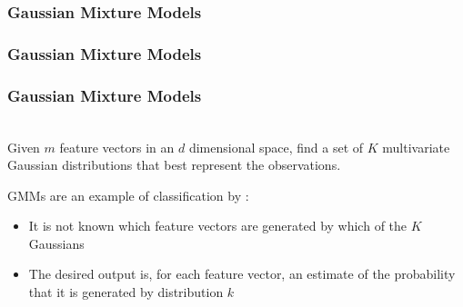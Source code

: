\begin{frame}
  \frametitle{Gaussian Mixture Models \cont}

  \begin{center}
  \end{center}
\end{frame}


\begin{frame}
  \frametitle{Gaussian Mixture Models \cont}

  \begin{center}
  \end{center}
\end{frame}


\begin{frame}
  \frametitle{Gaussian Mixture Models \cont}

   \\[.5cm]
  
  Given $m$ feature vectors in an $d$ dimensional space, find a set of $K$ multivariate Gaussian distributions that best represent the observations. 
  \pspread
  
  GMMs are an example of classification by : \pause

  \begin{itemize}
    \item It is not known which feature vectors are generated by which of the $K$ Gaussians \pause
    \item The desired output is, for each feature vector, an estimate of the probability that it is generated by distribution $k$
  \end{itemize}
\end{frame}


